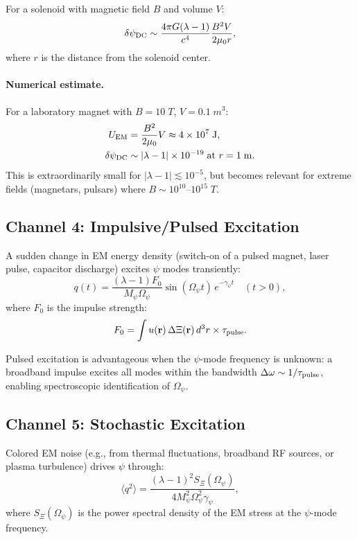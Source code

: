 \documentclass[aps,prd,twocolumn,superscriptaddress,floatfix,nofootinbib]{revtex4-2}
\newcommand{\Opsi}{\Omega_\psi}
\newcommand{\gpsi}{\gamma_\psi}
\newcommand{\Mpsi}{M_\psi}
\newcommand{\lam}{\lambda}
\begin{document}
For a solenoid with magnetic field $B$ and volume $V$:
\begin{equation}
\delta\psi_{\rm DC} \sim \frac{4\pi G(\lam-1)}{c^4}\frac{B^2 V}{2\mu_0 r},
\label{eq:dc-psi}
\end{equation}
where $r$ is the distance from the solenoid center.

\paragraph{Numerical estimate.}
For a laboratory magnet with $B = 10\;\si{T}$, $V = 0.1\;\si{m^3}$:
\begin{align}
U_{\rm EM} &= \frac{B^2}{2\mu_0}V \approx 4 \times 10^7\;\si{J},\\
\delta\psi_{\rm DC} &\sim |\lam-1| \times 10^{-19} \;\text{at } r = 1\;\si{m}.
\end{align}
This is extraordinarily small for $|\lam-1| \lesssim 10^{-5}$, but
becomes relevant for extreme fields (magnetars, pulsars) where
$B \sim 10^{10}$--$10^{15}\;\si{T}$.

\subsection{Channel 4: Impulsive/Pulsed Excitation}

A sudden change in EM energy density (switch-on of a pulsed magnet,
laser pulse, capacitor discharge) excites $\psi$ modes transiently:
\begin{equation}
q(t) = \frac{(\lam-1)F_0}{\Mpsi\Opsi}\sin(\Opsi t)\,e^{-\gpsi t}
\quad (t > 0),
\label{eq:impulse}
\end{equation}
where $F_0$ is the impulse strength:
\begin{equation}
F_0 = \int u(\mathbf{r})\,\Delta\Xi(\mathbf{r})\,d^3r \times \tau_{\rm pulse}.
\end{equation}

Pulsed excitation is advantageous when the $\psi$-mode frequency is
unknown: a broadband impulse excites all modes within the bandwidth
$\Delta\omega \sim 1/\tau_{\rm pulse}$, enabling spectroscopic
identification of $\Opsi$.

\subsection{Channel 5: Stochastic Excitation}

Colored EM noise (e.g., from thermal fluctuations, broadband RF sources,
or plasma turbulence) drives $\psi$ through:
\begin{equation}
\langle q^2 \rangle = \frac{(\lam-1)^2 S_\Xi(\Opsi)}{4\Mpsi^2\Opsi^2\gpsi},
\label{eq:stochastic}
\end{equation}
where $S_\Xi(\Opsi)$ is the power spectral density of the EM stress at
the $\psi$-mode frequency.
\end{document}
